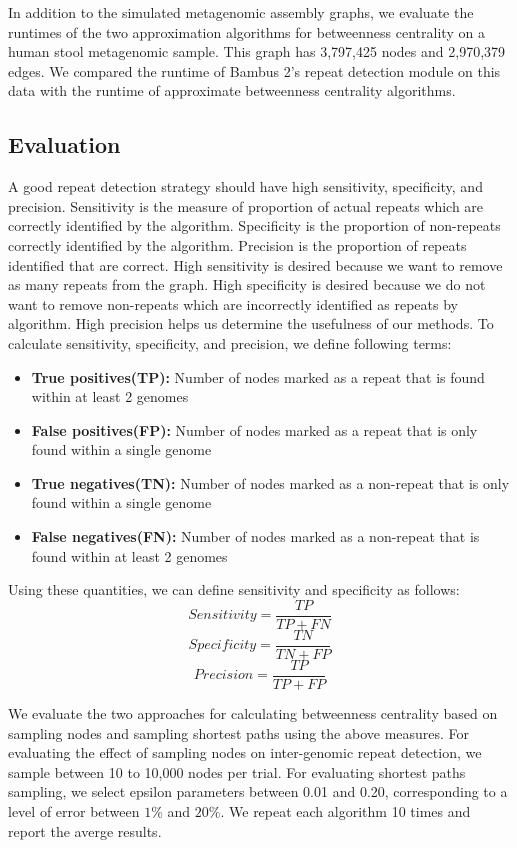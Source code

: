 \documentclass[runningheads,a4paper]{llncs}
\begin{document}
In addition to the simulated metagenomic assembly graphs, we evaluate the runtimes of the two approximation algorithms for betweenness centrality on a human stool metagenomic sample. This graph has 3,797,425 nodes and 2,970,379 edges. We compared the runtime of Bambus 2's repeat detection module on this data with the runtime of approximate betweenness centrality algorithms.  

\subsection*{Evaluation}
A good repeat detection strategy should have high sensitivity, specificity, and precision. Sensitivity is the measure of proportion of actual repeats which are correctly identified by the algorithm. Specificity is the proportion of non-repeats correctly identified by the algorithm. Precision is the proportion of repeats identified that are correct. High sensitivity is desired because we want to remove as many repeats from the graph. High specificity is desired because we do not want to remove non-repeats which are incorrectly identified as repeats by algorithm. High precision helps us determine the usefulness of our methods. To calculate sensitivity, specificity, and precision, we define following terms:
\begin{itemize}
\item \textbf{True positives(TP):} Number of nodes marked as a repeat that is found within at least 2 genomes
\item \textbf{False positives(FP):} Number of nodes marked as a repeat that is only found within a single genome
\item \textbf{True negatives(TN):} Number of nodes marked as a non-repeat that is only found within a single genome
\item \textbf{False negatives(FN):} Number of nodes marked as a non-repeat that is found within at least 2 genomes
\end{itemize}

Using these quantities, we can define sensitivity and specificity as follows:
 $$Sensitivity = \frac{TP}{TP+FN}$$
 $$Specificity = \frac{TN}{TN+FP}$$
 $$Precision = \frac{TP}{TP + FP}$$

We evaluate the two approaches for calculating betweenness centrality based on sampling nodes and sampling shortest paths using the above measures.
For evaluating the effect of sampling nodes on inter-genomic repeat detection, we sample between 10 to 10,000 nodes per trial.
For evaluating shortest paths sampling, we select epsilon parameters between 0.01 and 0.20, corresponding to a level of error between $1\%$ and $20\%$.
We repeat each algorithm 10 times and report the averge results.
\end{document}
